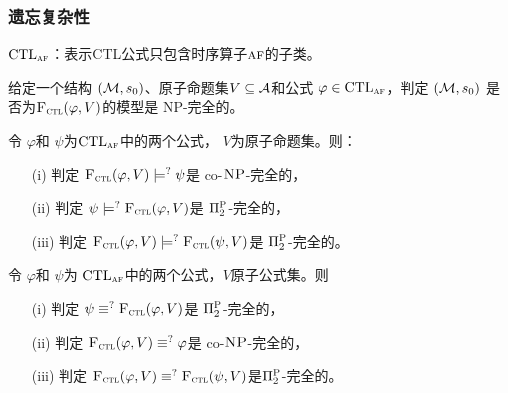 \documentclass[aspectratio=1610, 9pt, CJK]{beamer}
\begin{document}
\begin{frame}
	\frametitle{遗忘复杂性}
	{\footnotesize 
		$\textrm{CTL}_{\textsc{a}\textsc{f}}$：表示CTL公式只包含时序算子$\textsc{a} \textsc{f}$的子类。
		\begin{proposition}[模型检测]
			\label{modelChecking}
			给定一个结构 $({\cal M},s_0)$、原子命题集$V\subseteq{\cal A}$和公式 $\varphi \in \textrm{CTL}_{\textsc{a}\textsc{f}}$，判定 $({\cal M},s_0)$ 是否为${\textsc{F}_{\textsc{ctl}}}(\varphi, V)$的模型是 \textsc{NP}-完全的。
		\end{proposition}
		\begin{theorem}[Entailment]
			\label{thm:comF}
			令 $\varphi$和 $\psi$为$\textrm{CTL}_{\textsc{a} \textsc{f}}$中的两个公式， $V$为原子命题集。则：
			\begin{itemize}
				\item[(i)] 判定  ${\textsc{F}_{\textsc{ctl}}}(\varphi, V ) \models^? \psi$是 co-$\textsc{NP}$-完全的，
				\item[(ii)] 判定  $\psi \models^? {\textsc{F}_{\textsc{ctl}}}(\varphi, V)$是 $\Pi_2^{\textsc{P}}$-完全的，
				\item[(iii)] 判定 ${\textsc{F}_{\textsc{ctl}}}(\varphi, V) \models^? {\textsc{F}_{\textsc{ctl}}}(\psi, V)$是 $\Pi_2^{\textsc{P}}$-完全的。
			\end{itemize}
		\end{theorem}
		\begin{corollary}
			令 $\varphi$和 $\psi$为 $\textrm{CTL}_{\textsc{a} \textsc{f}}$中的两个公式，$V$原子公式集。则
			\begin{itemize}
				\item[(i)] 判定 $\psi \equiv^?{\textsc{F}_{\textsc{ctl}}}(\varphi, V)$是 $\Pi_2^{\textsc{P}}$-完全的，
				\item[(ii)] 判定 ${\textsc{F}_{\textsc{ctl}}}(\varphi, V) \equiv^? \varphi$是 co-$\textsc{NP}$-完全的，
				\item[(iii)] 判定 ${\textsc{F}_{\textsc{ctl}}}(\varphi, V) \equiv^? {\textsc{F}_{\textsc{ctl}}}(\psi, V)$是$\Pi_2^{\textsc{P}}$-完全的。
			\end{itemize}
		\end{corollary}
	}
\end{frame}
\end{document}
